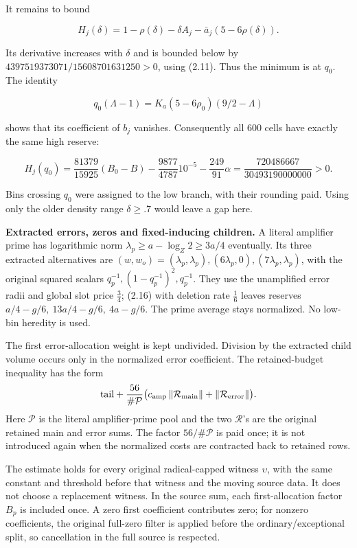 \documentclass[11pt,a4paper]{article}
\begin{document}
It remains to bound

\[
H_j(\delta)=1-\rho(\delta)-\delta A_j-\bar a_j(5-6\rho(\delta)).
\tag{2.21}
\]

Its derivative increases with \(\delta\) and is bounded below by
\(4397519373071/15608701631250>0\), using (2.11). Thus the minimum is at
\(q_0\). The identity

\[
q_0(\Lambda-1)=K_a(5-6\rho_0)(9/2-\Lambda)
\tag{2.22}
\]

shows that its coefficient of \(b_j\) vanishes. Consequently all 600
cells have exactly the same high reserve:

\[
H_j(q_0)=\frac{81379}{15925}(B_0-B)
-\frac{9877}{4787}10^{-5}-\frac{249}{91}\alpha
=\frac{720486667}{30493190000000}>0.
\tag{2.23}
\]

Bins crossing \(q_0\) were assigned to the low branch, with their
rounding paid. Using only the older density range \(\delta\ge.7\) would
leave a gap here.

\textbf{Extracted errors, zeros and fixed-inducing children.} A literal
amplifier prime has logarithmic norm \(\lambda_p\ge a-\log_Z2\ge3a/4\)
eventually. Its three extracted alternatives are
\((w,w_o)=(\lambda_p,\lambda_p),(6\lambda_p,0),(7\lambda_p,\lambda_p)\),
with the original squared scalars \(q_p^{-1},(1-q_p^{-1})^2,q_p^{-1}\).
They use the unamplified error radii and global slot price \(\frac{3}{4}\);
(2.16) with deletion rate \(\frac{1}{6}\) leaves reserves
\(a/4-g/6,\ 13a/4-g/6,\ 4a-g/6\). The prime average stays normalized. No
low-bin heredity is used.

The first error-allocation weight is kept undivided. Division by the
extracted child volume occurs only in the normalized error coefficient.
The retained-budget inequality has the form \[
\text{tail}+\frac{56}{\#\mathcal P}
 \bigl(c_{\rm amp}\,\|\mathcal R_{\rm main}\|
       +\|\mathcal R_{\rm error}\|\bigr).
\] Here \(\mathcal P\) is the literal amplifier-prime pool and the two
\(\mathcal R\)'s are the original retained main and error sums. The
factor \(56/\#\mathcal P\) is paid once; it is not introduced again when
the normalized costs are contracted back to retained rows.

The estimate holds for every original radical-capped witness
\(\upsilon\), with the same constant and threshold before that witness
and the moving source data. It does not choose a replacement witness. In
the source sum, each first-allocation factor \(B_p\) is included once. A
zero first coefficient contributes zero; for nonzero coefficients, the
original full-zero filter is applied before the ordinary/exceptional
split, so cancellation in the full source is respected.
\end{document}
